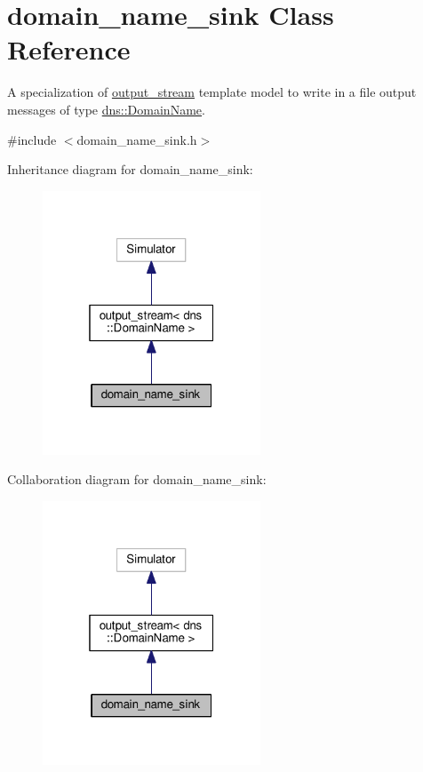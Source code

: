 \hypertarget{classdomain__name__sink}{}\section{domain\+\_\+name\+\_\+sink Class Reference}
\label{classdomain__name__sink}


A specialization of \hyperlink{classoutput__stream}{output\+\_\+stream} template model to write in a file output messages of type \hyperlink{structdns_1_1DomainName}{dns\+::\+Domain\+Name}.  




{\ttfamily \#include $<$domain\+\_\+name\+\_\+sink.\+h$>$}



Inheritance diagram for domain\+\_\+name\+\_\+sink\+:\nopagebreak
\begin{figure}[H]
\begin{center}
\leavevmode
\includegraphics[width=184pt]{classdomain__name__sink__inherit__graph}
\end{center}
\end{figure}


Collaboration diagram for domain\+\_\+name\+\_\+sink\+:\nopagebreak
\begin{figure}[H]
\begin{center}
\leavevmode
\includegraphics[width=184pt]{classdomain__name__sink__coll__graph}
\end{center}
\end{figure}
